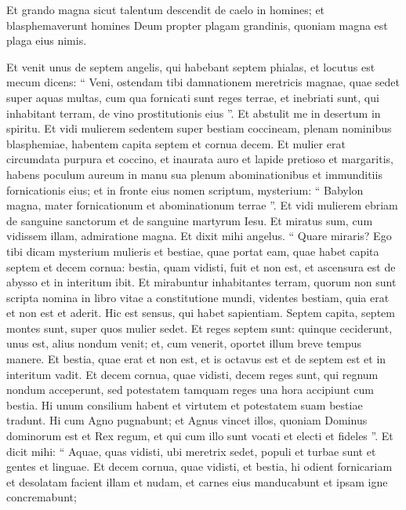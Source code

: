 \begin{biblechapter}
\begin{biblechapter}
\begin{biblechapter}
\begin{biblechapter}
\begin{biblechapter}
\begin{biblechapter}
\begin{biblechapter}
\begin{biblechapter}
\begin{biblechapter}
\begin{biblechapter}
\begin{biblechapter}
\begin{biblechapter}
\begin{biblechapter}
\begin{biblechapter}
\begin{biblechapter}
\begin{biblechapter}
\verse Et grando magna sicut talentum descendit de caelo in homines; et blasphemaverunt homines Deum propter plagam grandinis, quoniam magna est plaga eius nimis.
 
\begin{biblechapter}
\verse Et venit unus de septem angelis, qui habebant septem phialas, et locutus est mecum dicens: “ Veni, ostendam tibi damnationem meretricis magnae, quae sedet super aquas multas, 
\verse cum qua fornicati sunt reges terrae, et inebriati sunt, qui inhabitant terram, de vino prostitutionis eius ”. 
\verse Et abstulit me in desertum in spiritu. Et vidi mulierem sedentem super bestiam coccineam, plenam nominibus blasphemiae, habentem capita septem et cornua decem. 
 \verse Et mulier erat circumdata purpura et coccino, et inaurata auro et lapide pretioso et margaritis, habens poculum aureum in manu sua plenum abominationibus et immunditiis fornicationis eius; 
\verse et in fronte eius nomen scriptum, mysterium: “ Babylon magna, mater fornicationum et abominationum terrae ”.
 \verse Et vidi mulierem ebriam de sanguine sanctorum et de sanguine martyrum Iesu. Et miratus sum, cum vidissem illam, admiratione magna. 
\verse Et dixit mihi angelus. “ Quare miraris? Ego tibi dicam mysterium mulieris et bestiae, quae portat eam, quae habet capita septem et decem cornua: 
\verse bestia, quam vidisti, fuit et non est, et ascensura est de abysso et in interitum ibit. Et mirabuntur inhabitantes terram, quorum non sunt scripta nomina in libro vitae a constitutione mundi, videntes bestiam, quia erat et non est et aderit. 
\verse Hic est sensus, qui habet sapientiam. Septem capita, septem montes sunt, super quos mulier sedet. Et reges septem sunt: 
\verse quinque ceciderunt, unus est, alius nondum venit; et, cum venerit, oportet illum breve tempus manere. 
\verse Et bestia, quae erat et non est, et is octavus est et de septem est et in interitum vadit. 
\verse Et decem cornua, quae vidisti, decem reges sunt, qui regnum nondum acceperunt, sed potestatem tamquam reges una hora accipiunt cum bestia. 
\verse Hi unum consilium habent et virtutem et potestatem suam bestiae tradunt. 
\verse Hi cum Agno pugnabunt; et Agnus vincet illos, quoniam Dominus dominorum est et Rex regum, et qui cum illo sunt vocati et electi et fideles ”.
 \verse Et dicit mihi: “ Aquae, quas vidisti, ubi meretrix sedet, populi et turbae sunt et gentes et linguae. 
\verse Et decem cornua, quae vidisti, et bestia, hi odient fornicariam et desolatam facient illam et nudam, et carnes eius manducabunt et ipsam igne concremabunt; 

\end{biblechapter}
\end{biblechapter}
\end{biblechapter}
\end{biblechapter}
\end{biblechapter}
\end{biblechapter}
\end{biblechapter}
\end{biblechapter}
\end{biblechapter}
\end{biblechapter}
\end{biblechapter}
\end{biblechapter}
\end{biblechapter}
\end{biblechapter}
\end{biblechapter}
\end{biblechapter}
\end{biblechapter}
